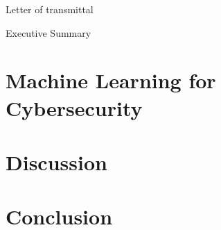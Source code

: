 \documentclass[12pt]{article}
\begin{document}
    Letter of transmittal

    \pagebreak

    

    Executive Summary

    \pagebreak

    \tableofcontents

    \pagebreak

    

    \section{Machine Learning for Cybersecurity}

    \section{Discussion}

    \pagebreak

    \section{Conclusion}

    \pagebreak

    
\end{document}
